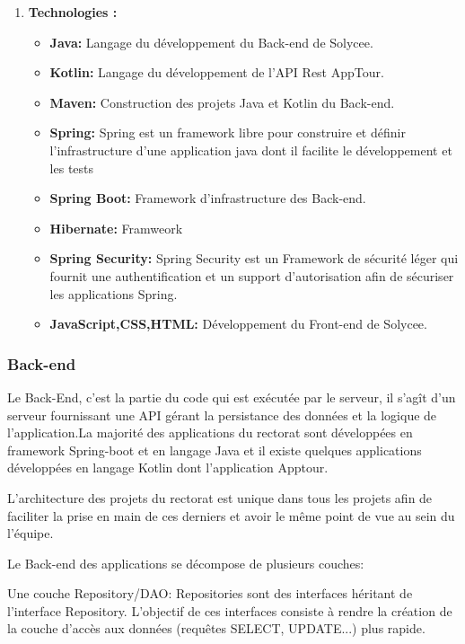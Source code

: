 \documentclass[12pt]{article}
\begin{document}
\begin{enumerate}
\item \textbf{Technologies :}\\

\begin{itemize}
\item \textbf{Java: }Langage du développement du Back-end de Solycee. 
\item \textbf{Kotlin: }Langage du développement de l'API Rest AppTour.
\item \textbf{Maven: }Construction des projets Java et Kotlin du Back-end.
\item \textbf{Spring: }Spring est un framework libre pour construire et définir l'infrastructure d'une application java dont il facilite le développement et les tests
\item \textbf{Spring Boot: }Framework d'infrastructure des Back-end.
\item \textbf{Hibernate: } Framweork 
\item \textbf{Spring Security: }Spring Security est un Framework de sécurité léger qui fournit une authentification et un support d’autorisation afin de sécuriser les applications Spring.
\item \textbf{JavaScript,CSS,HTML: } Développement du Front-end de Solycee.
\end{itemize} 

\end{enumerate}

\subsubsection{Back-end}

Le Back-End, c’est la partie du code qui est exécutée par le serveur, il s’agît d'un serveur fournissant une API gérant la persistance des données et la logique de l'application.La majorité des applications du rectorat sont développées en framework Spring-boot et en langage Java et il existe quelques applications développées en langage Kotlin dont l'application Apptour.

L'architecture des projets du rectorat est unique dans tous les projets afin  de faciliter la prise en main de ces derniers et avoir le même point de vue au sein du l'équipe.

Le Back-end des applications se décompose de plusieurs couches: \newline

Une couche Repository/DAO: Repositories sont des interfaces héritant de l'interface Repository. L'objectif de ces interfaces consiste à rendre la création de la couche d'accès aux données (requêtes SELECT, UPDATE...) plus rapide.\newline
\end{document}
